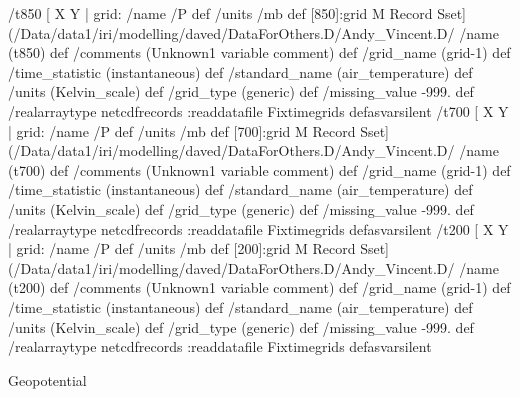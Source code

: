 \begin{ingrid}
 /t850{
[ X Y |  grid:
       /name /P def
       /units /mb def
       [850]:grid
M Record Sset] (/Data/data1/iri/modelling/daved/DataForOthers.D/Andy_Vincent.D/%
/name (t850) def
 /comments (Unknown1 variable comment) def
 /grid_name (grid-1) def
 /time_statistic (instantaneous) def
 /standard_name (air_temperature) def
 /units (Kelvin_scale) def
 /grid_type (generic) def
 /missing_value -999. def
 /realarraytype netcdfrecords :readdatafile Fixtimegrids
}defasvarsilent
/t700 {
[ X Y |  grid:
       /name /P def
       /units /mb def
       [700]:grid
M Record Sset] (/Data/data1/iri/modelling/daved/DataForOthers.D/Andy_Vincent.D/%
/name (t700) def
 /comments (Unknown1 variable comment) def
 /grid_name (grid-1) def
 /time_statistic (instantaneous) def
 /standard_name (air_temperature) def
 /units (Kelvin_scale) def
 /grid_type (generic) def
 /missing_value -999. def
 /realarraytype netcdfrecords :readdatafile Fixtimegrids
} defasvarsilent
/t200 {
[ X Y | grid:
       /name /P def
       /units /mb def
       [200]:grid
  M Record Sset] (/Data/data1/iri/modelling/daved/DataForOthers.D/Andy_Vincent.D/%
/name (t200) def
 /comments (Unknown1 variable comment) def
 /grid_name (grid-1) def
 /time_statistic (instantaneous) def
 /standard_name (air_temperature) def
 /units (Kelvin_scale) def
 /grid_type (generic) def
 /missing_value -999. def
 /realarraytype netcdfrecords :readdatafile Fixtimegrids
}defasvarsilent
\end{ingrid}
Geopotential

